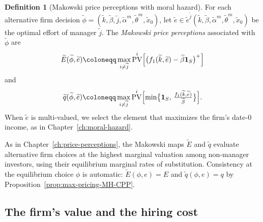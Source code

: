 \documentclass[11pt,a4paper,oneside]{book}
\def\1{\mathbf{1}}
\DeclareMathOperator{\PV}{PV}
\theoremstyle{plain}
\theoremstyle{definition}
\newtheorem{definition}[theorem]{Definition}
\theoremstyle{remark}
\numberwithin{equation}{chapter}
\begin{document}
\begin{definition}[Makowski price perceptions with moral hazard]\label{def:makowski-MH-CPP}
For each alternative firm decision $\widetilde{\phi} = (\widetilde{k}, \widetilde{\beta}, \widetilde{j}, \widetilde{\alpha}^m, \widetilde{\theta}^m, \widetilde{x}_0)$, let $\widetilde{e} \in \widetilde{e}^{\widetilde{j}}(\widetilde{k}, \widetilde{\beta}, \widetilde{\alpha}^m, \widetilde{\theta}^m, \widetilde{x}_0)$ be the optimal effort of manager $\widetilde{j}$.
The \emph{Makowski price perceptions} associated with $\widetilde{\phi}$ are
\begin{equation}\label{eq:makowski-E-MH-CPP}
  \widetilde{E}(\widetilde{\phi}, \widetilde{e})
  \coloneqq \max_{i \neq \widetilde{j}} \PV^i\Bigl[ \bigl( f_1(\widetilde{k}, \widetilde{e}) - \widetilde{\beta} \1_S \bigr)^+ \Bigr]
\end{equation}
and
\begin{equation}\label{eq:makowski-q-MH-CPP}
  \widetilde{q}(\widetilde{\phi}, \widetilde{e})
  \coloneqq \max_{i \neq \widetilde{j}} \PV^i\Bigl[ \min\bigl\{ \1_S, \, \tfrac{f_1(\widetilde{k}, \widetilde{e})}{\widetilde{\beta}} \bigr\} \Bigr].
\end{equation}
When $\widetilde{e}$ is multi-valued, we select the element that maximizes the firm's date-$0$ income, as in Chapter~\ref{ch:moral-hazard}.
\end{definition}

As in Chapter~\ref{ch:price-perceptions}, the Makowski maps $\widetilde{E}$ and $\widetilde{q}$ evaluate alternative firm choices at the highest marginal valuation among non-manager investors, using their equilibrium marginal rates of substitution.
Consistency at the equilibrium choice $\phi$ is automatic: $\widetilde{E}(\phi, e) = E$ and $\widetilde{q}(\phi, e) = q$ by Proposition~\ref{prop:max-pricing-MH-CPP}.

\subsection{The firm's value and the hiring cost}
\end{document}
